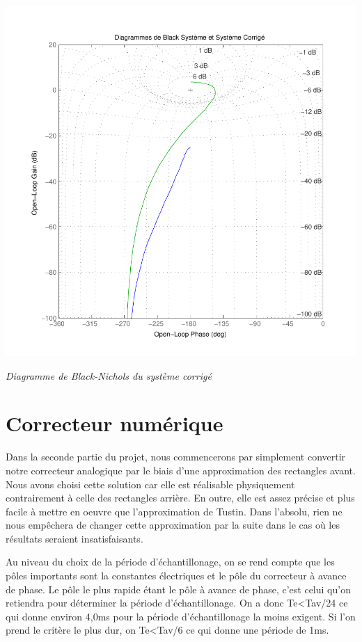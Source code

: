 \documentclass[11pt, french]{article} %
\begin{document}
\begin{center}
\includegraphics[scale=1]{MatBlackFredValues.pdf}

\emph{Diagramme de Black-Nichols du système corrigé}
\end{center}

\section{Correcteur numérique}

Dans la seconde partie du projet, nous commencerons par simplement convertir notre correcteur analogique par le biais d'une approximation des rectangles avant. Nous avons choisi cette solution car elle est réalisable physiquement contrairement à celle des rectangles arrière. En outre, elle est assez précise et plus facile à mettre en oeuvre que l'approximation de Tustin. Dans l'absolu, rien ne nous empêchera de changer cette approximation par la suite dans le cas où les résultats seraient insatisfaisants. 

Au niveau du choix de la période d'échantillonage, on se rend compte que les pôles importants sont la constantes électriques et le pôle du correcteur à avance de phase. Le pôle le plus rapide étant le pôle à avance de phase, c'est celui qu'on retiendra pour déterminer la période d'échantillonage. On a donc Te<Tav/24 ce qui donne environ 4,0ms pour la période d'échantillonage la moins exigent. Si l'on prend le critère le plus dur, on  Te<Tav/6 ce qui donne une période de 1ms. 
\end{document}
